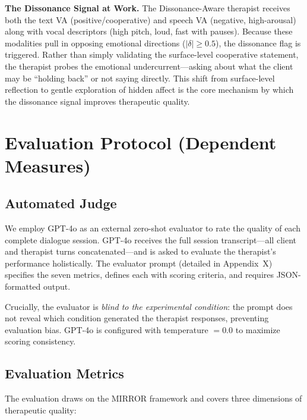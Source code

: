 \textbf{The Dissonance Signal at Work.}
The Dissonance-Aware therapist receives both the text VA (positive/cooperative) and speech VA (negative, high-arousal) along with vocal descriptors (high pitch, loud, fast with pauses). Because these modalities pull in opposing emotional directions ($|\delta| \geq 0.5$), the dissonance flag is triggered. Rather than simply validating the surface-level cooperative statement, the therapist probes the emotional undercurrent---asking about what the client may be ``holding back'' or not saying directly. This shift from surface-level reflection to gentle exploration of hidden affect is the core mechanism by which the dissonance signal improves therapeutic quality.


\section{Evaluation Protocol (Dependent Measures)}

\subsection{Automated Judge}

We employ GPT-4o as an external zero-shot evaluator to rate the quality of each complete dialogue session. GPT-4o receives the full session transcript---all client and therapist turns concatenated---and is asked to evaluate the therapist's performance holistically. The evaluator prompt (detailed in Appendix~X) specifies the seven metrics, defines each with scoring criteria, and requires JSON-formatted output.

Crucially, the evaluator is \emph{blind to the experimental condition}: the prompt does not reveal which condition generated the therapist responses, preventing evaluation bias. GPT-4o is configured with temperature $= 0.0$ to maximize scoring consistency.

\subsection{Evaluation Metrics}

The evaluation draws on the MIRROR framework \cite{kim-etal-2025-mirror} and covers three dimensions of therapeutic quality:

